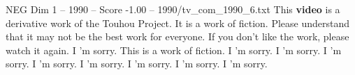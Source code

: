 \begin{textsample}{NEG Dim 1 – 1990 – Score -1.00 – 1990/tv\_com\_1990\_6.txt}  \label{ex:f1_neg_043}
This \textbf{video} is a derivative work of the Touhou Project.
It is a work of fiction.
Please understand that it may not be the best work for everyone.
If you don't like the work, please watch it again.
I 'm sorry.
This is a work of fiction.
I 'm sorry.
I 'm sorry.
I 'm sorry.
I 'm sorry.
I 'm sorry.
I 'm sorry.
I 'm sorry.
I 'm sorry.

\end{textsample}
